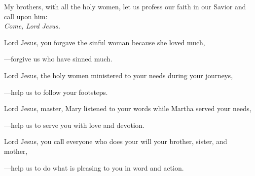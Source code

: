 \intercessions\indent

\begin{hangpar}

My brothers, with all the holy women, let us profess our faith in our Savior and call upon him:\\
\emph{Come, Lord Jesus.}

\medskip Lord Jesus, you forgave the sinful woman because she loved much,

{\color{red}---\thinspace}forgive us who have sinned much.

\medskip Lord Jesus, the holy women ministered to your needs during your journeys,

{\color{red}---\thinspace}help us to follow your footsteps.

\medskip Lord Jesus, master, Mary listened to your words while Martha served your needs,

{\color{red}---\thinspace}help us to serve you with love and devotion.

\medskip Lord Jesus, you call everyone who does your will your brother, sister, and mother,

{\color{red}---\thinspace}help us to do what is pleasing to you in word and action.

\end{hangpar}